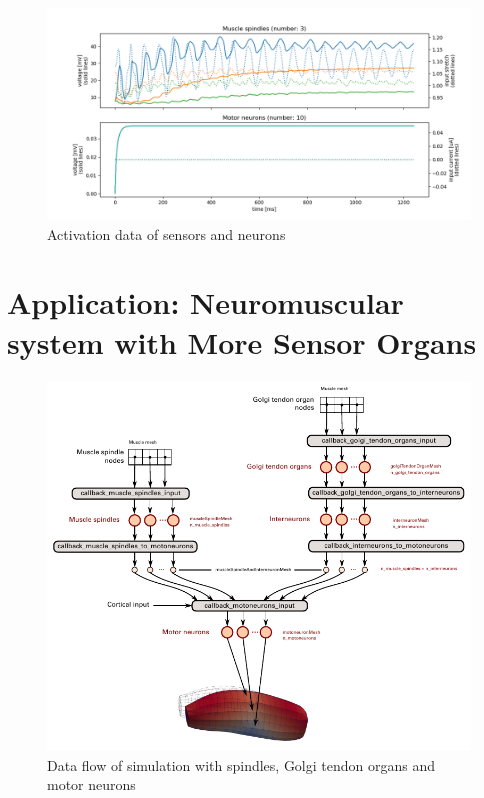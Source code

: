 \begin{figure}[H]
  \centering%
  \includegraphics[width=\textwidth]{images/results/application/neuromuscular_spindle_out.png}%
  \caption{Activation data of sensors and neurons}%
  \label{fig:neuromuscular_schematic}%
\end{figure}

\section{Application: Neuromuscular system with More Sensor Organs}

\begin{figure}[H]
  \centering%
  \includegraphics[width=\textwidth]{images/results/application/neuromuscular_schematic.pdf}%
  \caption{Data flow of simulation with spindles, Golgi tendon organs and motor neurons}%
  \label{fig:neuromuscular_schematic}%
\end{figure}

